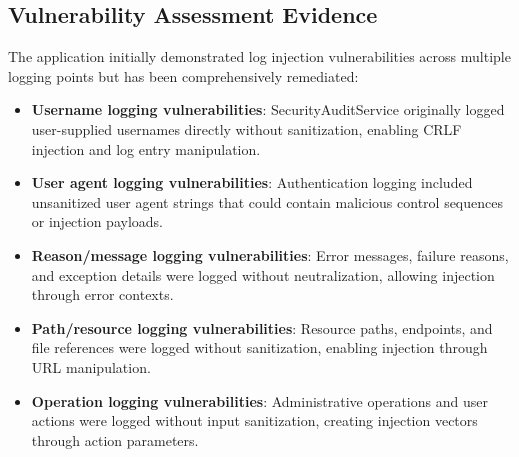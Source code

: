 \documentclass[]{UCD_CS_FYP_Report}
\begin{document}
\subsection{Vulnerability Assessment Evidence}
The application initially demonstrated log injection vulnerabilities across multiple logging points but has been comprehensively remediated:
\begin{itemize}
	\item \textbf{Username logging vulnerabilities}: SecurityAuditService originally logged user-supplied usernames directly without sanitization, enabling CRLF injection and log entry manipulation.
	\item \textbf{User agent logging vulnerabilities}: Authentication logging included unsanitized user agent strings that could contain malicious control sequences or injection payloads.
	\item \textbf{Reason/message logging vulnerabilities}: Error messages, failure reasons, and exception details were logged without neutralization, allowing injection through error contexts.
	\item \textbf{Path/resource logging vulnerabilities}: Resource paths, endpoints, and file references were logged without sanitization, enabling injection through URL manipulation.
	\item \textbf{Operation logging vulnerabilities}: Administrative operations and user actions were logged without input sanitization, creating injection vectors through action parameters.
\end{itemize}
\end{document}

